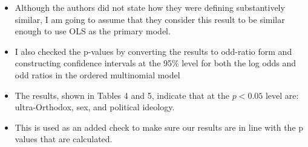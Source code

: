 \documentclass[12pt,letterpaper]{article}
\begin{document}
\begin{itemize}
		\item Although the authors did not state how they were defining substantively similar, I am going to assume that they consider this result to be similar enough to use OLS as the primary model.  
		\item I also checked the p-values by converting the results to odd-ratio form and constructing confidence intervals at the 95\% level for both the log odds and odd ratios in the ordered multinomial model
			
		\item The results, shown in Tables 4 and 5, indicate that at the $p<0.05$ level are: ultra-Orthodox, sex, and political ideology.
		\item This is used as an added check to make sure our results are in line with the p values that are calculated.
		

\end{itemize}
	
\newpage
	
\end{document}

